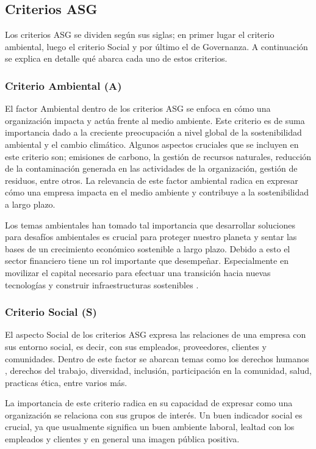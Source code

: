 \subsection{Criterios ASG}
Los criterios ASG se dividen según sus siglas; en primer lugar el criterio ambiental, luego el criterio Social y por último el de Governanza. A continuación se explica en detalle qué abarca cada uno de estos criterios.

\subsubsection{Criterio Ambiental (A)}
El factor Ambiental dentro de los criterios ASG se enfoca en cómo una organización impacta y actúa frente al medio ambiente. Este criterio es de suma importancia dado a la creciente preocupación a nivel global de la sostenibilidad ambiental y el cambio climático. Algunos aspectos cruciales que se incluyen en este criterio son; emisiones de carbono, la gestión de recursos naturales, reducción de la contaminación generada en las actividades de la organización, gestión de residuos, entre otros. La relevancia de este factor ambiental radica en expresar cómo una empresa impacta en el medio ambiente y contribuye a la sostenibilidad a largo plazo. 

Los temas ambientales han tomado tal importancia que desarrollar soluciones para desafíos ambientales es crucial para proteger nuestro planeta y sentar las bases de un crecimiento económico sostenible a largo plazo. Debido a esto el sector financiero tiene un rol importante que desempeñar. Especialmente en movilizar el capital necesario para efectuar una transición hacia nuevas tecnologías y construir infraestructuras sostenibles \cite{jpmorgan_chase_2021_2021}.

\subsubsection{Criterio Social (S)}
El aspecto Social de los criterios ASG expresa las relaciones de una empresa con sus entorno social, es decir, con sus empleados, proveedores, clientes y comunidades. Dentro de este factor se abarcan temas como los derechos humanos , derechos del trabajo, diversidad, inclusión, participación en la comunidad, salud, practicas ética, entre varios más.

La importancia de este criterio radica en su capacidad de expresar como una organización se relaciona con sus grupos de interés. Un buen indicador social es crucial, ya que usualmente significa un buen ambiente laboral, lealtad con los empleados y clientes y en general una imagen pública positiva.

